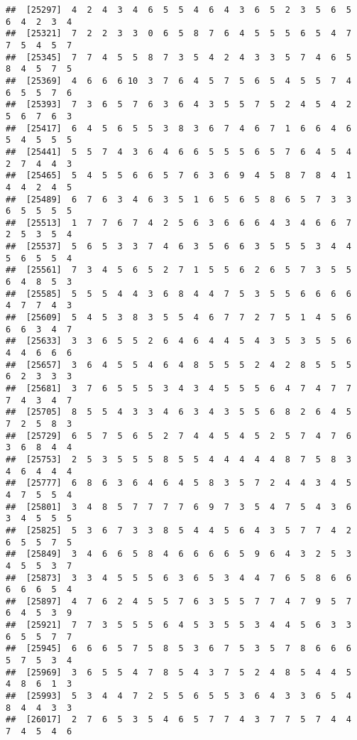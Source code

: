 \documentclass[
]{book}
\begin{document}
\begin{verbatim}
##  [25297]  4  2  4  3  4  6  5  5  4  6  4  3  6  5  2  3  5  6  5  6  4  2  3  4
##  [25321]  7  2  2  3  3  0  6  5  8  7  6  4  5  5  5  6  5  4  7  7  5  4  5  7
##  [25345]  7  7  4  5  5  8  7  3  5  4  2  4  3  3  5  7  4  6  5  8  4  5  7  5
##  [25369]  4  6  6  6 10  3  7  6  4  5  7  5  6  5  4  5  5  7  4  6  5  5  7  6
##  [25393]  7  3  6  5  7  6  3  6  4  3  5  5  7  5  2  4  5  4  2  5  6  7  6  3
##  [25417]  6  4  5  6  5  5  3  8  3  6  7  4  6  7  1  6  6  4  6  5  4  5  5  5
##  [25441]  5  5  7  4  3  6  4  6  6  5  5  5  6  5  7  6  4  5  4  2  7  4  4  3
##  [25465]  5  4  5  5  6  6  5  7  6  3  6  9  4  5  8  7  8  4  1  4  4  2  4  5
##  [25489]  6  7  6  3  4  6  3  5  1  6  5  6  5  8  6  5  7  3  3  6  5  5  5  5
##  [25513]  1  7  7  6  7  4  2  5  6  3  6  6  6  4  3  4  6  6  7  2  5  3  5  4
##  [25537]  5  6  5  3  3  7  4  6  3  5  6  6  3  5  5  5  3  4  4  5  6  5  5  4
##  [25561]  7  3  4  5  6  5  2  7  1  5  5  6  2  6  5  7  3  5  5  6  4  8  5  3
##  [25585]  5  5  5  4  4  3  6  8  4  4  7  5  3  5  5  6  6  6  6  4  7  7  4  3
##  [25609]  5  4  5  3  8  3  5  5  4  6  7  7  2  7  5  1  4  5  6  6  6  3  4  7
##  [25633]  3  3  6  5  5  2  6  4  6  4  4  5  4  3  5  3  5  5  6  4  4  6  6  6
##  [25657]  3  6  4  5  5  4  6  4  8  5  5  5  2  4  2  8  5  5  5  6  2  3  3  3
##  [25681]  3  7  6  5  5  5  3  4  3  4  5  5  5  6  4  7  4  7  7  7  4  3  4  7
##  [25705]  8  5  5  4  3  3  4  6  3  4  3  5  5  6  8  2  6  4  5  7  2  5  8  3
##  [25729]  6  5  7  5  6  5  2  7  4  4  5  4  5  2  5  7  4  7  6  3  6  8  4  4
##  [25753]  2  5  3  5  5  5  8  5  5  4  4  4  4  4  8  7  5  8  3  4  6  4  4  4
##  [25777]  6  8  6  3  6  4  6  4  5  8  3  5  7  2  4  4  3  4  5  4  7  5  5  4
##  [25801]  3  4  8  5  7  7  7  7  6  9  7  3  5  4  7  5  4  3  6  3  4  5  5  5
##  [25825]  5  3  6  7  3  3  8  5  4  4  5  6  4  3  5  7  7  4  2  6  5  5  7  5
##  [25849]  3  4  6  6  5  8  4  6  6  6  6  5  9  6  4  3  2  5  3  4  5  5  3  7
##  [25873]  3  3  4  5  5  5  6  3  6  5  3  4  4  7  6  5  8  6  6  6  6  6  5  4
##  [25897]  4  7  6  2  4  5  5  7  6  3  5  5  7  7  4  7  9  5  7  6  4  5  3  9
##  [25921]  7  7  3  5  5  5  6  4  5  3  5  5  3  4  4  5  6  3  3  6  5  5  7  7
##  [25945]  6  6  6  5  7  5  8  5  3  6  7  5  3  5  7  8  6  6  6  5  7  5  3  4
##  [25969]  3  6  5  5  4  7  8  5  4  3  7  5  2  4  8  5  4  4  5  4  8  6  1  3
##  [25993]  5  3  4  4  7  2  5  5  6  5  5  3  6  4  3  3  6  5  4  8  4  4  3  3
##  [26017]  2  7  6  5  3  5  4  6  5  7  7  4  3  7  7  5  7  4  4  7  4  5  4  6

\end{verbatim}
\end{document}
